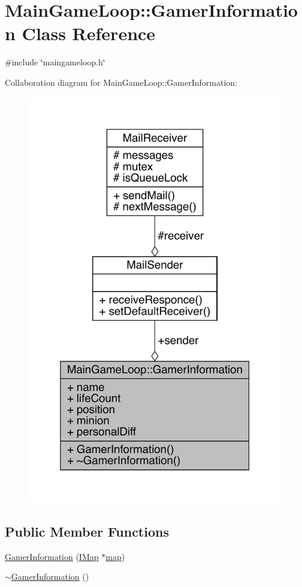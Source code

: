\hypertarget{a00213}{}\section{Main\+Game\+Loop\+:\+:Gamer\+Information Class Reference}
\label{a00213}


{\ttfamily \#include \char`\"{}maingameloop.\+h\char`\"{}}



Collaboration diagram for Main\+Game\+Loop\+:\+:Gamer\+Information\+:
\nopagebreak
\begin{figure}[H]
\begin{center}
\leavevmode
\includegraphics[width=316pt]{dd/ded/a00211}
\end{center}
\end{figure}
\subsection*{Public Member Functions}
\begin{DoxyCompactItemize}
\item 
\hyperlink{a00213_a6b58de3576e4b204fc38073794dfa1d2}{Gamer\+Information} (\hyperlink{a00165}{I\+Map} $\ast$\hyperlink{a00209_ae0ccec14d7db91cf6db41349a73b41a7}{map})
\item 
\hyperlink{a00213_a19842dcddbd89a64210977394060ca3a}{$\sim$\+Gamer\+Information} ()
\end{DoxyCompactItemize}
